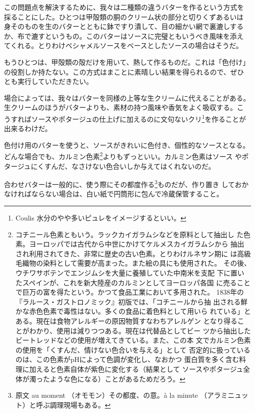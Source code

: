 この問題点を解決するために、我々は二種類の違うバターを作るという方式を
採ることにした。ひとつは甲殻類の胴のクリーム状の部分と切りくずあるいは
身そのものを生のバターとともに鉢ですり潰して、目の細かい網で裏漉しする
か、布で漉すというもの。このバターはソースに完璧ともいうべき風味を添え
てくれる。とりわけベシャメルソースをベースとしたソースの場合はそうだ。

もうひとつは、甲殻類の殻だけを用いて、熱して作るものだ。これは「色付け」
の役割しか持たない。この方式はまことに素晴しい結果を得られるので、ぜひ
とも実行していただきたい。

場合によっては、我々はバターを同様の上等な生クリームに代えることがある。
生クリームのほうがバターよりも、素材の持つ風味や香気をよく吸収する。こ
うすればソースやポタージュの仕上げに加えるのに文句ないクリ\footnote{Coulis
  水分のやや多いピュレをイメージするといい。}を作ることが 出来るわけだ。

色付け用のバターを使うと、ソースがきれいに色付き、個性的なソースとなる。
どんな場合でも、カルミン色素\footnote{コチニール色素ともいう。ラックカイガラムシなどを原料として抽出し
  た色素。ヨーロッパでは古代から中世にかけてケルメスカイガラムシから
  抽出され利用されてきた、非常に歴史の古い色素。とりわけルネサン期に
  は高級毛織物の染料として需要が高まった。また絵の具にも使用された。
  その後、ウチワサボテンでエンジムシを大量に養殖していた中南米を支配
  下に置いたスペインが、これを新大陸産のカルミンとしてヨーロッパ各国
  に売ることで巨万の富を得たという。かつて食品工業において多用された。
  1838年の『ラルース・ガストロノミック』初版では、「コチニールから抽
  出される鮮かな赤色色素で毒性はない。多くの食品に着色料として用いら
  れている」とある。現在は食物アレルギーの原因物質すなわちアレルゲン
  となり得ることがわかり、使用は減りつつある。現在は代替品としてビー
  ツから抽出したビートレッドなどの使用が増えてきている。また、この本
  文でカルミン色素の使用を「くすんだ、情けない色合いを与える」として
  否定的に扱っているのは、この色素がpHによって色調が変化し、なおかつ
  蛋白質を多く含む料理に加えると色素自体が紫色に変化する（結果として
  ソースやポタージュ全体が濁ったような色になる）ことがあるためだろう。}よりもずっといい。カルミン色素はソース
やポタージュにくすんだ、なさけない色合いしか与えてはくれないのだ。

合わせバターは一般的に、使う際にその都度作る\footnote{原文 au moment
  （オモモン）その都度、の意。à la minute （アラミニュッ
  ト）と呼ぶ調理現場もある。}ものだが、作り置き
しておかなければならない場合は、白い紙で円筒形に包んで冷蔵保管すること。

